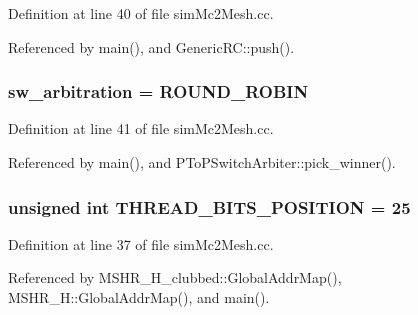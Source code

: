 Definition at line 40 of file simMc2Mesh.cc.

Referenced by main(), and GenericRC::push().
\subsubsection[{sw\_\-arbitration}]{ {\bf sw\_\-arbitration} = ROUND\_\-ROBIN}\label{simMc2Mesh_8cc_045249e2273cf27331b1300b811640ba}




Definition at line 41 of file simMc2Mesh.cc.

Referenced by main(), and PToPSwitchArbiter::pick\_\-winner().
\subsubsection[{THREAD\_\-BITS\_\-POSITION}]{\setlength{\rightskip}{0pt plus 5cm}unsigned int {\bf THREAD\_\-BITS\_\-POSITION} = 25}\label{simMc2Mesh_8cc_581f0c063e972c5f202149f2e3ce7452}




Definition at line 37 of file simMc2Mesh.cc.

Referenced by MSHR\_\-H\_\-clubbed::GlobalAddrMap(), MSHR\_\-H::GlobalAddrMap(), and main().